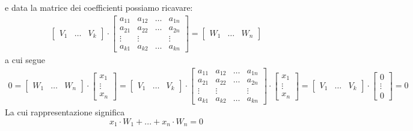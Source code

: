 \documentclass[italian]{article}
\begin{document}
\\\\
e data la matrice dei coefficienti possiamo ricavare:
\begin{gather*}
	\begin{bmatrix}
		V_1 & \dots & V_k
	\end{bmatrix}
	\cdot
	\begin{bmatrix}
			a_{11} & a_{12} & \dots & a_{1n} \\
			a_{21} & a_{22} & \dots & a_{2n} \\
			\vdots & \vdots &  & \vdots \\
			a_{k1} & a_{k2} & \dots & a_{kn}
	\end{bmatrix}
	=
	\begin{bmatrix}
		W_1 & \dots & W_n
	\end{bmatrix}
\end{gather*}
a cui segue
\begin{gather*}
	0 =
	\begin{bmatrix}
		W_1 & \dots & W_n
	\end{bmatrix}
	\cdot
	\begin{bmatrix}
		x_1 \\ \vdots \\ x_n
	\end{bmatrix}
	=
	\begin{bmatrix}
		V_1 & \dots & V_k
	\end{bmatrix}
	\cdot
	\begin{bmatrix}
		a_{11} & a_{12} & \dots & a_{1n} \\
		a_{21} & a_{22} & \dots & a_{2n} \\
		\vdots & \vdots &  & \vdots \\
		a_{k1} & a_{k2} & \dots & a_{kn}
	\end{bmatrix}
	\cdot
	\begin{bmatrix}
		x_1 \\ \vdots \\ x_n
	\end{bmatrix}
	=
	\begin{bmatrix}
		V_1 & \dots & V_k
	\end{bmatrix}
	\cdot
	\begin{bmatrix}
		0 \\ \vdots \\ 0
	\end{bmatrix}
	= 0
\end{gather*}
La cui rappresentazione significa
\[
	x_1 \cdot W_1 + ... + x_n \cdot W_n = 0
\]
\end{document}
